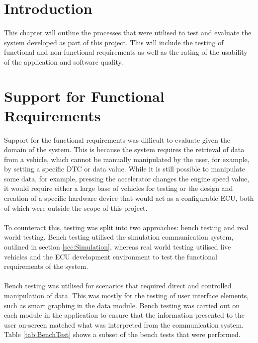\section{Introduction}
	\paragraph{}{
	This chapter will outline the processes that were utilised to test and evaluate the system developed as part of this project. This will include the testing of functional and non-functional requirements as well as the rating of the usability of the application and software quality.
	}
	
\section{Support for Functional Requirements}
	\paragraph{}{
	Support for the functional requirements was difficult to evaluate given the domain of the system. This is because the system requires the retrieval of data from a vehicle, which cannot be manually manipulated by the user, for example, by setting a specific DTC or data value. While it is still possible to manipulate some data, for example, pressing the accelerator changes the engine speed value, it would require either a large base of vehicles for testing or the design and creation of a specific hardware device that would act as a configurable ECU, both of which were outside the scope of this project.
	}

	\paragraph{}{
	To counteract this, testing was split into two approaches: bench testing and real world testing. Bench testing utilised the simulation communication system, outlined in section \ref{sec:Simulation}, whereas real world testing utilised live vehicles and the ECU development environment to test the functional requirements of the system. 
	}
	
	\paragraph{}{
	Bench testing was utilised for scenarios that required direct and controlled manipulation of data. This was mostly for the testing of user interface elements, such as smart graphing in the data module. Bench testing was carried out on each module in the application to ensure that the information presented to the user on-screen matched what was interpreted from the communication system. Table \ref{tab:BenchTest} shows a subset of the bench tests that were performed.
	
	
	}
	
